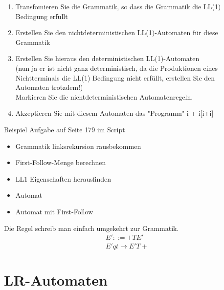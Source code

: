 \documentclass[
  ngerman
  ,12pt
  ,pdftex
]{article}
\begin{document}
\begin{enumerate}
  \item Transfomieren Sie die Grammatik, so dass die Grammatik die LL(1) Bedingung erfüllt
  \item Erstellen Sie den nichtdeterministischen LL(1)-Automaten für diese Grammatik
  \item Erstellen Sie hieraus den deterministischen LL(1)-Automaten\\ (nun ja er ist nicht ganz deterministisch, da die Produktionen eines Nichtterminals die LL(1) Bedingung nicht erfüllt, erstellen Sie den Automaten trotzdem!)\\
  Markieren Sie die nichtdeterministischen Automatenregeln.
  \item Akzeptieren Sie mit diesem Automaten das "Programm" i + i[i+i]
\end{enumerate}
Beispiel Aufgabe auf Seite 179 im Script\\
\begin{itemize}
  \item Grammatik linksrekursion rausbekommen
  \item First-Follow-Menge berechnen 
  \item LL1 Eigenschaften herausfinden
  \item Automat
  \item Automat mit First-Follow
\end{itemize}
Die Regel schreib man einfach umgekehrt zur Grammatik.
\begin{align*}
  E' ::= +TE'\\
  E'qt\longrightarrow E'T+
\end{align*}

\section{LR-Automaten}
\end{document}
